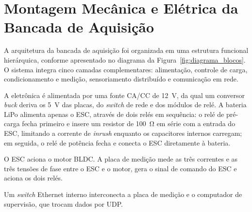 \section{Montagem Mecânica e Elétrica da Bancada de Aquisição}

A arquitetura da bancada de aquisição foi organizada em uma estrutura funcional hierárquica, conforme apresentado no diagrama da Figura~\ref{fig:diagrama_blocos}. O sistema integra cinco camadas complementares: alimentação, controle de carga, condicionamento e medição, sensoriamento distribuído e comunicação em rede.

A eletrônica é alimentada por uma fonte CA/CC de \SI{12}{\volt}, da qual um
conversor \textit{buck} deriva os \SI{5}{\volt} das placas, do
\textit{switch} de rede e dos módulos de relé. A bateria LiPo alimenta
apenas o ESC, através de dois relés em sequência: o relé de pré-carga fecha
primeiro e insere um resistor de \SI{100}{\ohm} em série com a entrada do
ESC, limitando a corrente de \textit{inrush} enquanto os capacitores
internos carregam; em seguida, o relé de potência fecha e conecta o ESC
diretamente à bateria.

O ESC aciona o motor BLDC. A placa de medição mede as três correntes e as
três tensões de fase entre o ESC e o motor, gera o sinal de comando do ESC e
aciona os dois relés.

Um \textit{switch} Ethernet interno interconecta a placa de medição e o
computador de supervisão, que trocam dados por UDP.

